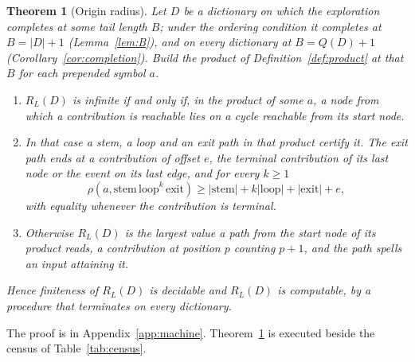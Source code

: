 \documentclass[11pt,a4paper]{article}
\theoremstyle{definition}
\theoremstyle{plain}
\newtheorem{theorem}{Theorem}
\newcommand{\ripple}{R_{L}}
\begin{document}
\begin{theorem}[Origin radius]\label{thm:origin}
Let \(D\) be a dictionary on which the exploration completes at some tail length \(B\); under the ordering condition it
completes at \(B = |D| + 1\) (Lemma~\ref{lem:B}), and on every dictionary at \(B = Q(D) + 1\)
(Corollary~\ref{cor:completion}). Build the product of Definition~\ref{def:product} at that \(B\) for each prepended
symbol \(a\).
\begin{enumerate}
\item \(\ripple(D)\) is infinite if and only if, in the product of some \(a\), a node from which a contribution is
  reachable lies on a cycle reachable from its start node.
\item In that case a stem, a loop and an exit path in that product certify it. The exit path ends at a contribution of
offset
  \(e\), the terminal contribution of its last node or the event on its last edge, and for every \(k \ge 1\) \[\rho(a,
  \mathrm{stem}\,\mathrm{loop}^k\,\mathrm{exit}) \ge |\mathrm{stem}| + k|\mathrm{loop}| + |\mathrm{exit}| + e,\] with
  equality whenever the contribution is terminal.
\item Otherwise \(\ripple(D)\) is the largest value a path from the start node of its product reads, a contribution at
  position \(p\) counting \(p + 1\), and the path spells an input attaining it.
\end{enumerate}
Hence finiteness of \(\ripple(D)\) is decidable and \(\ripple(D)\) is computable, by a procedure that terminates on
every dictionary.
\end{theorem}

The proof is in Appendix~\ref{app:machine}. Theorem~\ref{thm:origin} is executed beside the census of
Table~\ref{tab:census}.

\end{document}
